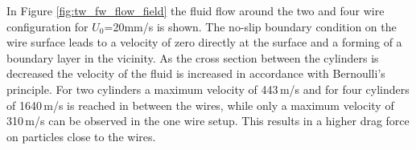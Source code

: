 In Figure \ref{fig:tw_fw_flow_field} the fluid flow around the two and four wire configuration for $U_{0}$=20mm/s is shown. The no-slip boundary condition on the wire surface leads to a velocity of zero directly at the surface and a forming of a boundary layer in the vicinity. As the cross section between the cylinders is decreased the velocity of the fluid is increased in accordance with Bernoulli's principle. For two cylinders a maximum velocity of 443\,\textmu m/s and for four cylinders of 1640\,\textmu m/s is reached in between the wires, while only a maximum velocity of 310\,\textmu m/s can be observed in the one wire setup. This results in a higher drag force on particles close to the wires.   
  
\begin{figure}[H]
            \begin{subfigure}{0.49\textwidth}
                  \flushleft
          \end{subfigure}\hfill
        \begin{subfigure}{0.49\textwidth}
                \flushright

\end{subfigure}
\end{figure}

